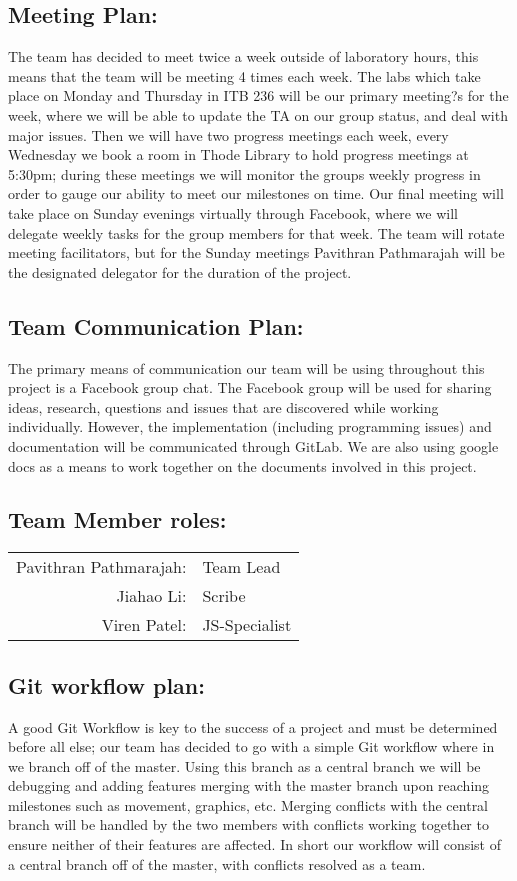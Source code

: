 \documentclass{article}
\begin{document}
\subsection*{Meeting Plan:}  
The team has decided to meet twice a week outside of laboratory hours, this
means that the team will be meeting 4 times each week. The labs which take place
on Monday and Thursday in ITB 236 will be our primary meeting?s for the week,
where we will be able to update the TA on our group status, and deal with major
issues. Then we will have two progress meetings each week, every Wednesday we
book a room in Thode Library to hold progress meetings at 5:30pm; during these
meetings we will monitor the groups weekly progress in order to gauge our
ability to meet our milestones on time. Our final meeting will take place on
Sunday evenings virtually through Facebook, where we will delegate weekly tasks
for the group members for that week. The team will rotate meeting facilitators,
but for the Sunday meetings Pavithran Pathmarajah will be the designated
delegator for the duration of the project.

\subsection*{Team Communication Plan:}  
The primary means of communication our
team will be using throughout this project is a Facebook group chat. The
Facebook group will be used for sharing ideas, research, questions and issues
that are discovered while working individually. However, the implementation
(including programming issues) and documentation will be communicated through
GitLab. We are also using google docs as a means to work together on the
documents involved in this project.

\subsection*{Team Member roles:}
\begin{table}[h!]     
	\begin{tabular}{r l}    
		Pavithran Pathmarajah: & Team Lead\\   
		Jiahao Li: & Scribe\\   
		Viren Patel: & JS-Specialist
	\end{tabular}
\end{table}

	
	
\subsection*{Git workflow plan:}  
A good Git Workflow is key to the success of a
project and must be determined before all else; our team has decided to go with
a simple Git workflow where in we branch off of the master. Using this branch as
a central branch we will be debugging and adding features merging with the
master branch upon reaching milestones such as movement, graphics, etc. Merging
conflicts with the central branch will be handled by the two members with
conflicts working together to ensure neither of their features are affected. In
short our workflow will consist of a central branch off of the master, with
conflicts resolved as a team.
\end{document}
